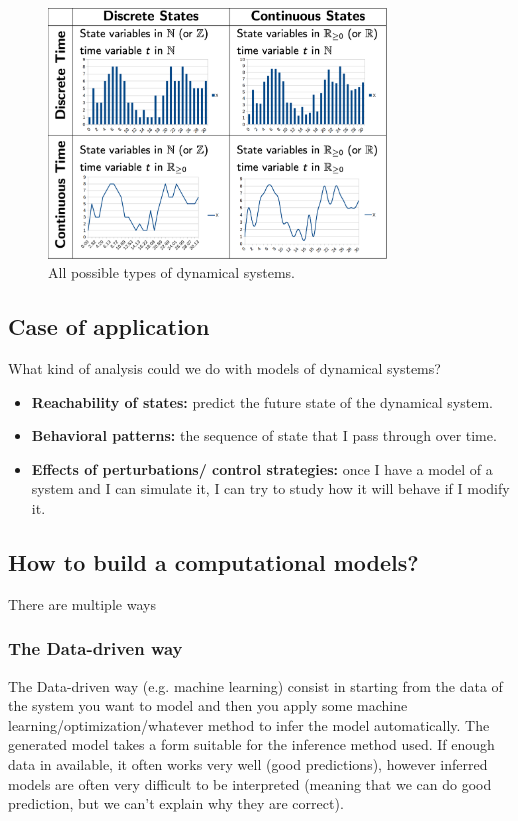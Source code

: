 \begin{figure}[h]
    \centering
    \includegraphics[width=0.8\textwidth]{Images/01-Introduction/states.png}
    \caption{All possible types of dynamical systems.}
\end{figure}

\subsection{Case of application}
What kind of analysis could we do with models of dynamical systems?

\begin{itemize}
    \item \textbf{Reachability of states:} predict the future state of the dynamical system.

    \item \textbf{Behavioral patterns:} the sequence of state that I pass through over time.

    \item \textbf{Effects of perturbations/ control strategies:} once I have a model of a system and I can simulate it, I can try to study how it will behave if I modify it.
\end{itemize}

\subsection{How to build a computational models?}
There are multiple ways

\subsubsection{The Data-driven way}
The Data-driven way (e.g. machine learning) consist in starting from the data of the system you want to model and then you apply some machine learning/optimization/whatever method to infer the model automatically. The generated model takes a form suitable for the inference method used. If enough data in available, it often works very well (good predictions), however inferred models are often very difficult to be interpreted (meaning that we can do good prediction, but we can't explain why they are correct).

